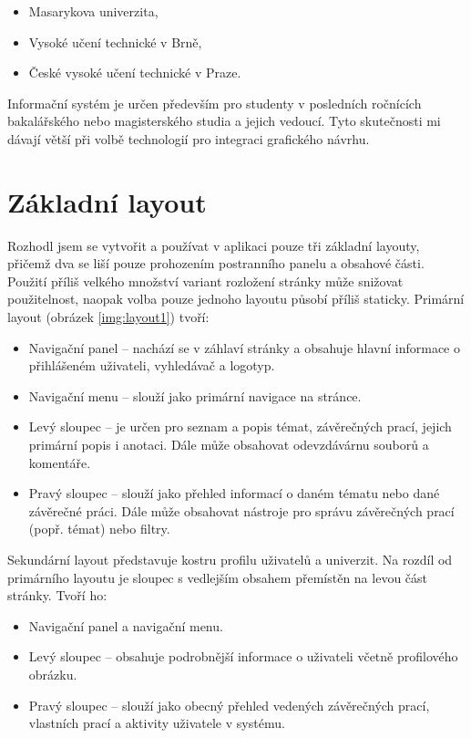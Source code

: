 \begin{itemize}
    \item Masarykova univerzita,
    \item Vysoké učení technické v Brně,
    \item České vysoké učení technické v Praze.
\end{itemize}

Informační systém je určen především pro studenty v posledních ročnících bakalářského nebo magisterského studia a jejich vedoucí. Tyto skutečnosti mi dávají větší  při volbě technologií pro integraci grafického návrhu.

\section{Základní layout}

Rozhodl jsem se vytvořit a používat v aplikaci pouze tři základní layouty, přičemž dva se liší pouze prohozením postranního panelu a obsahové části. Použití příliš velkého množství variant rozložení stránky může snižovat použitelnost, naopak volba pouze jednoho layoutu působí příliš staticky. Primární layout (obrázek \ref{img:layout1}) tvoří:

\begin{itemize}
    \item Navigační panel -- nachází se v záhlaví stránky a obsahuje hlavní informace o přihlášeném uživateli, vyhledávač a logotyp.
    \item Navigační menu -- slouží jako primární navigace na stránce.
    \item Levý sloupec -- je určen pro seznam a popis témat, závěrečných prací, jejich primární popis i anotaci. Dále může obsahovat odevzdávárnu souborů a komentáře.
    \item Pravý sloupec -- slouží jako přehled informací o daném tématu nebo dané závěrečné práci. Dále může obsahovat nástroje pro správu závěrečných prací (popř. témat) nebo filtry.
\end{itemize}

Sekundární layout představuje kostru profilu uživatelů a univerzit. Na rozdíl od primárního layoutu je sloupec s vedlejším obsahem přemístěn na levou část stránky. Tvoří ho:

\begin{itemize}
    \item Navigační panel a navigační menu.
    \item Levý sloupec -- obsahuje podrobnější informace o uživateli včetně profilového obrázku.
    \item Pravý sloupec -- slouží jako obecný přehled vedených závěrečných prací, vlastních prací a aktivity uživatele v systému.
\end{itemize}

